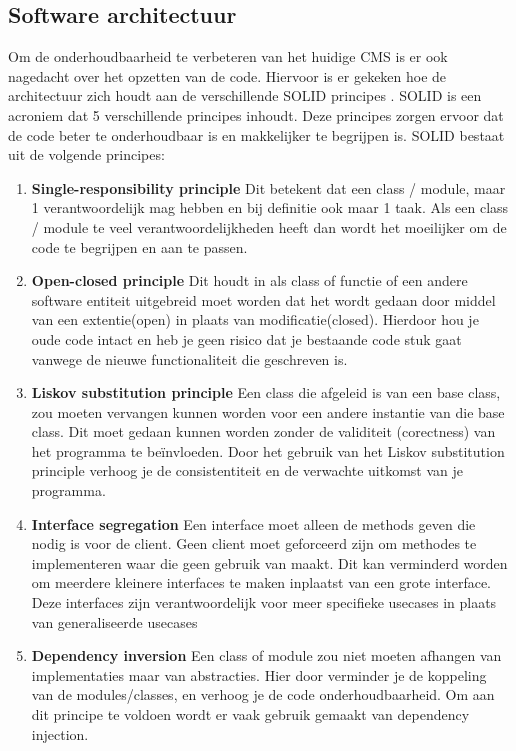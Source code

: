 \subsection{Software architectuur}
Om de onderhoudbaarheid te verbeteren van het huidige CMS is er ook nagedacht over het opzetten van de code.
Hiervoor is er gekeken hoe de architectuur zich houdt aan de verschillende SOLID principes \parencite{SOLID}. 
SOLID is een acroniem dat 5 verschillende principes inhoudt.
Deze principes zorgen ervoor dat de code beter te onderhoudbaar is en makkelijker te begrijpen is.
SOLID bestaat uit de volgende principes:

\begin{enumerate}
    \item \textbf{Single-responsibility principle}
    Dit betekent dat een class / module, maar 1 verantwoordelijk mag hebben en bij definitie ook maar 1 taak.
    Als een class / module te veel verantwoordelijkheden heeft dan wordt het moeilijker om de code te begrijpen en aan te passen.

    \item \textbf{Open-closed principle}
    Dit houdt in als class of functie of een andere software entiteit uitgebreid moet worden dat het wordt gedaan door middel van een extentie(open) in plaats van modificatie(closed).
    Hierdoor hou je oude code intact en heb je geen risico dat je bestaande code stuk gaat vanwege de nieuwe functionaliteit die geschreven is. 
        
    \item \textbf{Liskov substitution principle} 
    Een class die afgeleid is van een base class, zou moeten vervangen kunnen worden voor  een andere instantie van die base class.
    Dit moet gedaan kunnen worden zonder de validiteit (corectness) van het programma te beïnvloeden.
    Door het gebruik van het Liskov substitution principle verhoog je de consistentiteit en de verwachte uitkomst van je programma.

    \item \textbf{Interface segregation} 
    Een interface moet alleen de methods geven die nodig is voor de client. 
    Geen client moet geforceerd zijn om methodes te implementeren waar die geen gebruik van maakt.
    Dit kan verminderd worden om meerdere kleinere interfaces te maken inplaatst van een grote interface.
    Deze interfaces zijn verantwoordelijk voor meer specifieke usecases in plaats van generaliseerde usecases

    \item \textbf{Dependency inversion} 
    Een class of module zou niet moeten afhangen van implementaties maar van abstracties.
    Hier door verminder je de koppeling van de modules/classes, en verhoog je de code onderhoudbaarheid.
    Om aan dit principe te voldoen wordt er vaak gebruik gemaakt van dependency injection.
\end{enumerate}

